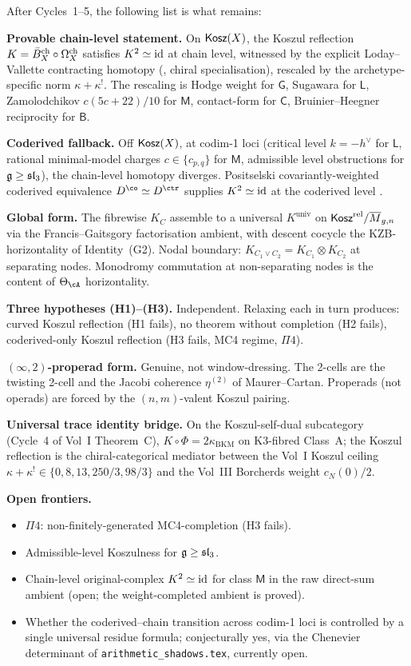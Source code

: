 After Cycles~1--5, the following list is what remains:

\textbf{Provable chain-level statement.} On $\mathsf{Kosz}(X)$, the Koszul
reflection $K = \bar{B}^{\mathrm{ch}}_X\circ\Omega^{\mathrm{ch}}_X$ satisfies
$K^{2}\simeq\mathrm{id}$ at chain level, witnessed by the explicit
Loday--Vallette contracting homotopy (\cite[eq.\ (2.17)]{LV12},
chiral specialisation), rescaled by the archetype-specific
norm $\kappa + \kappa^{!}$. The rescaling is Hodge weight for
$\mathsf{G}$, Sugawara for $\mathsf{L}$, Zamolodchikov
$c(5c+22)/10$ for $\mathsf{M}$, contact-form for $\mathsf{C}$,
Bruinier--Heegner reciprocity for $\mathsf{B}$.

\textbf{Coderived fallback.} Off $\mathsf{Kosz}(X)$, at codim-1 loci
(critical level $k = -h^{\vee}$ for $\mathsf{L}$, rational minimal-model
charges $c\in\{c_{p,q}\}$ for $\mathsf{M}$, admissible level
obstructions for $\mathfrak{g}\geq\mathfrak{sl}_{3}$), the chain-level
homotopy diverges. Positselski covariantly-weighted coderived
equivalence $D^{\co}\simeq D^{\ctr}$ supplies $K^{2}\simeq\mathrm{id}$ at
the coderived level \cite[App.\ A.5]{Positselski2011}.

\textbf{Global form.} The fibrewise $K_{C}$ assemble to a
universal $K^{\mathrm{univ}}$ on
$\mathsf{Kosz}^{\mathrm{rel}}/\overline{M}_{g,n}$ via the Francis--Gaitsgory
factorisation ambient, with descent cocycle the
KZB-horizontality of Identity~(G2). Nodal boundary:
$K_{C_{1}\vee C_{2}} = K_{C_{1}}\otimes K_{C_{2}}$ at separating
nodes. Monodromy commutation at non-separating nodes is the
content of $\Theta_{\cA}$ horizontality.

\textbf{Three hypotheses (H1)--(H3).} Independent. Relaxing each in
turn produces: curved Koszul reflection (H1 fails), no theorem
without completion (H2 fails), coderived-only Koszul reflection
(H3 fails, MC4 regime, $\Pi 4$).

\textbf{$(\infty,2)$-properad form.} Genuine, not window-dressing.
The 2-cells are the twisting 2-cell and the Jacobi coherence
$\eta^{(2)}$ of Maurer--Cartan. Properads (not operads) are forced
by the $(n,m)$-valent Koszul pairing.

\textbf{Universal trace identity bridge.} On the Koszul-self-dual
subcategory (Cycle~4 of Vol~I Theorem~C),
$K\circ\Phi = 2\kappa_{\mathrm{BKM}}$
on K3-fibred Class~A; the Koszul reflection is the
chiral-categorical mediator between the Vol~I Koszul ceiling
$\kappa + \kappa^{!}\in\{0, 8, 13, 250/3, 98/3\}$ and the Vol~III
Borcherds weight $c_{N}(0)/2$.

\textbf{Open frontiers.}
\begin{itemize}
\item $\Pi 4$: non-finitely-generated MC4-completion (H3 fails).
\item Admissible-level Koszulness for $\mathfrak{g}\geq\mathfrak{sl}_{3}$.
\item Chain-level original-complex $K^{2}\simeq\mathrm{id}$ for class
$\mathsf{M}$ in the raw direct-sum ambient (open; the
weight-completed ambient is proved).
\item Whether the coderived--chain transition across codim-1 loci
is controlled by a single universal residue formula; conjecturally
yes, via the Chenevier determinant of
\texttt{arithmetic\_shadows.tex}, currently open.
\end{itemize}

